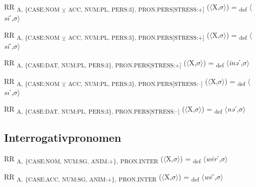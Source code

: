 {\begin{exe}
 RR \textsubscript{A, \{CASE:NOM} \textsubscript{${\veebar}$}\textsubscript{ ACC, NUM:PL, PERS:3\}, PRON.PERS[STRESS:+]} ($\langle$X,$\sigma $$\rangle$) = \textsubscript{def} $\langle$\textit{s\=i}ˊ,$\sigma $$\rangle$
\end{exe}

\begin{exe}
 RR \textsubscript{A, \{CASE:NOM} \textsubscript{${\veebar}$}\textsubscript{ ACC, NUM:PL, PERS:3\}, PRON.PERS[STRESS:+]} ($\langle$X,$\sigma $$\rangle$) = \textsubscript{def} $\langle$\textit{si}ˊ,$\sigma $$\rangle$
\end{exe}

\begin{exe}
 RR \textsubscript{A, \{CASE:DAT, NUM:PL, PERS:3\}, PRON.PERS[STRESS:+]} ($\langle$X,$\sigma $$\rangle$) = \textsubscript{def} $\langle$\textit{\=inə}ˊ,$\sigma $$\rangle$
\end{exe}

\begin{exe}
 RR \textsubscript{A, \{CASE:NOM} \textsubscript{${\veebar}$}\textsubscript{ ACC, NUM:PL, PERS:3\}, PRON.PERS[STRESS:–]} ($\langle$X,$\sigma $$\rangle$) = \textsubscript{def} $\langle$\textit{sı}ˊ,$\sigma $$\rangle$
\end{exe}

\begin{exe}
 RR \textsubscript{A, \{CASE:DAT, NUM:PL, PERS:3\}, PRON.PERS[STRESS:–]} ($\langle$X,$\sigma $$\rangle$) = \textsubscript{def} $\langle$\textit{nə}ˊ,$\sigma $$\rangle$
\end{exe}

\subsection{Interrogativpronomen}

\begin{exe}
 RR \textsubscript{A,} \textsubscript{\{CASE:NOM, NUM:SG, ANIM:+\},} \textsubscript{PRON.INTER} ($\langle$X,$\sigma $$\rangle$) = \textsubscript{def} $\langle$\textit{w\=er}ˊ,$\sigma $$\rangle$
\end{exe}

\begin{exe}
 RR \textsubscript{A,} \textsubscript{\{CASE:ACC, NUM:SG, ANIM:+\},} \textsubscript{PRON.INTER} ($\langle$X,$\sigma $$\rangle$) = \textsubscript{def} $\langle$\textit{w\=e}ˊ,$\sigma $$\rangle$
\end{exe}

}
